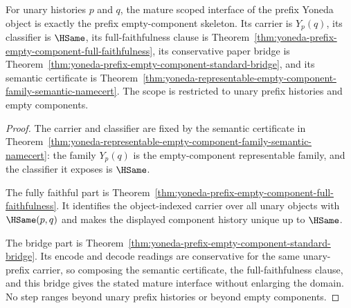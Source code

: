 \begin{theorem}
\label{thm:yoneda-prefix-empty-component-mature-interface}
For unary histories $p$ and $q$, the mature scoped interface of the prefix
Yoneda object is exactly the prefix empty-component skeleton. Its carrier is
$Y_p(q)$, its classifier is $\HSame$, its full-faithfulness clause is
Theorem~\ref{thm:yoneda-prefix-empty-component-full-faithfulness}, its
conservative paper bridge is
Theorem~\ref{thm:yoneda-prefix-empty-component-standard-bridge}, and its
semantic certificate is
Theorem~\ref{thm:yoneda-representable-empty-component-family-semantic-namecert}.
The scope is restricted to unary prefix histories and empty components.
\end{theorem}
\begin{proof}
The carrier and classifier are fixed by the semantic certificate in
Theorem~\ref{thm:yoneda-representable-empty-component-family-semantic-namecert}:
the family $Y_p(q)$ is the empty-component representable family, and the
classifier it exposes is $\HSame$.

The fully faithful part is
Theorem~\ref{thm:yoneda-prefix-empty-component-full-faithfulness}. It identifies
the object-indexed carrier over all unary objects with $\HSame(p,q)$ and makes
the displayed component history unique up to $\HSame$.

The bridge part is
Theorem~\ref{thm:yoneda-prefix-empty-component-standard-bridge}. Its encode and
decode readings are conservative for the same unary-prefix carrier, so composing
the semantic certificate, the full-faithfulness clause, and this bridge gives
the stated mature interface without enlarging the domain. No step ranges beyond
unary prefix histories or beyond empty components.
\end{proof}

